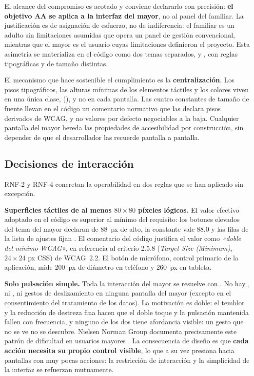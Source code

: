 El alcance del compromiso es acotado y conviene declararlo con precisión: \textbf{el objetivo AA se
aplica a la interfaz del mayor}, no al panel del familiar. La justificación es de asignación de esfuerzo,
no de indiferencia: el familiar es un adulto sin limitaciones asumidas que opera un panel de gestión
convencional, mientras que el mayor es el usuario cuyas limitaciones definieron el proyecto. Esta
asimetría se materializa en el código como dos temas separados,  y , con reglas tipográficas y de tamaño distintas.

El mecanismo que hace sostenible el cumplimiento es la \textbf{centralización}. Los pisos tipográficos, las
alturas mínimas de los elementos táctiles y los colores viven en una única clase, 
(), y no en cada pantalla. Las cuatro constantes de tamaño de fuente
llevan en el código un comentario normativo que las declara pisos derivados de WCAG, y no valores por
defecto negociables a la baja. Cualquier pantalla del mayor hereda las propiedades de accesibilidad por
construcción, sin depender de que el desarrollador las recuerde pantalla a pantalla.

\subsection{Decisiones de interacción}

RNF-2 y RNF-4 concretan la operabilidad en dos reglas que se han aplicado sin excepción.

\textbf{Superficies táctiles de al menos $80\times80$ píxeles lógicos.} El valor efectivo adoptado en el
código es superior al mínimo del requisito: los botones elevados del tema del mayor declaran
 de 88~px de alto, la constante  vale 88.0 y las filas de
la lista de ajustes fijan . El comentario del código justifica el valor como
\emph{«doble del mínimo WCAG»}, en referencia al criterio 2.5.8 (\emph{Target Size (Minimum)}, $24\times24$
px CSS) de WCAG~2.2. El botón de micrófono, control primario de la aplicación, mide 200~px de diámetro en
teléfono y 260~px en tableta.

\textbf{Solo pulsación simple.} Toda la interacción del mayor se resuelve con . No hay
, ni , ni gestos de deslizamiento en ninguna pantalla del mayor (excepto
en el consentimiento del tratamiento de los datos). La
motivación es doble: el temblor y la reducción de destreza fina hacen que el doble toque y la pulsación
mantenida fallen con frecuencia, y ninguno de los dos tiene afordancia visible: un gesto que no se ve no
se descubre. Nielsen Norman Group documenta precisamente este patrón de dificultad en usuarios mayores
\autocite{Kane2019}. La consecuencia de diseño es que \textbf{cada acción necesita su propio control
visible}, lo que a su vez presiona hacia pantallas con muy pocas acciones: la restricción de interacción y
la simplicidad de la interfaz se refuerzan mutuamente.

